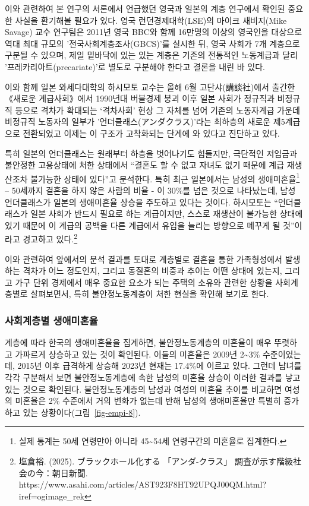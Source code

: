\documentclass[
  letterpaper,
  DIV=11,
  numbers=noendperiod]{scrartcl}
\begin{document}
이와 관련하여 본 연구의 서론에서 언급했던 영국과 일본의 계층 연구에서
확인된 중요한 사실을 환기해볼 필요가 있다. 영국 런던경제대학(LSE)의
마이크 새비지(Mike Savage) 교수 연구팀은 2011년 영국 BBC와 함께 16만명의
이상의 영국인을 대상으로 역대 최대 규모의 '전국사회계층조사(GBCS)'를
실시한 뒤, 영국 사회가 7개 계층으로 구분될 수 있으며, 제일 밑바닥에 있는
있는 계층은 기존의 전통적인 노동계급과 달리 '프레카리아트(precariate)'로
별도로 구분해야 한다고 결론을 내린 바 있다.

이와 함께 일본 와세다대학의 하시모토 교수는 올해 6월 고단샤(講談社)에서
출간한 《새로운 계급사회》에서 1990년대 버블경제 붕괴 이후 일본 사회가
정규직과 비정규직 등으로 격차가 확대되는 `격차사회' 현상 그 자체를 넘어
기존의 노동자계급 가운데 비정규직 노동자의 일부가
'언더클래스(アンダクラス)'라는 최하층의 새로운 제5계급으로 전환되었고
이제는 이 구조가 고착화되는 단계에 와 있다고 진단하고 있다.

특히 일본의 언더클래스는 원래부터 하층을 벗어나기도 힘들지만, 극단적인
저임금과 불안정한 고용상태에 처한 상태에서 ``결혼도 할 수 없고 자녀도
없기 때문에 계급 재생산조차 불가능한 상태에 있다''고 분석한다. 특히 최근
일본에서는 남성의 생애미혼율\footnote{실제 통계는 50세 연령만아 아니라
  45\textasciitilde54세 연령구간의 미혼율로 집계한다.} -- 50세까지
결혼을 하지 않은 사람의 비율 - 이 30\%를 넘은 것으로 나타났는데, 남성
언더클래스가 일본의 생애미혼율 상승을 주도하고 있다는 것이다. 하시모토는
``언더클래스가 일본 사회가 반드시 필요로 하는 계급이지만, 스스로
재생산이 불가능한 상태에 있기 때문에 이 계급의 공백을 다른 계급에서
유입을 늘리는 방향으로 메꾸게 될 것''이라고 경고하고 있다.\footnote{塩倉裕.
  (2025). ブラックホール化する 「アンダ-クラス」
  調査が示す階級社会の今：朝日新聞.
  https://www.asahi.com/articles/AST923F8HT92UPQJ00QM.html?iref=ogimage\_rek}

이와 관련하여 앞에서의 분석 결과를 토대로 계층별로 결혼을 통한
가족형성에서 발생하는 격차가 어느 정도인지, 그리고 동질혼의 비중과
추이는 어떤 상태에 있는지, 그리고 가구 단위 경제에서 매우 중요한 요소가
되는 주택의 소유와 관련한 상황을 사회계층별로 살펴보면서, 특히
불안정노동계층이 처한 현실을 확인해 보기로 한다.

\subsubsection{사회계층별
생애미혼율}\label{uxc0acuxd68cuxacc4uxce35uxbcc4-uxc0dduxc560uxbbf8uxd63cuxc728}

계층에 따라 한국의 생애미혼율을 집계하면, 불안정노동계층의 미혼율이 매우
뚜렷하고 가파르게 상승하고 있는 것이 확인된다. 이들의 미혼율은 2009년
2\textasciitilde3\% 수준이었는데, 2015년 이후 급격하게 상승해 2023년
현재는 17.4\%에 이르고 있다. 그런데 남녀를 각각 구분해서 보면
불안정노동계층에 속한 남성의 미혼율 상승이 이러한 결과를 낳고 있는
것으로 확인된다. 불안정노동계층의 남성과 여성의 미혼율 추이를 비교하면
여성의 미혼율은 2\% 수준에서 거의 변화가 없는데 반해 남성의 생애미혼율만
특별히 증가하고 있는 상황이다(그림~\ref{fig-empi-8}).
\end{document}
